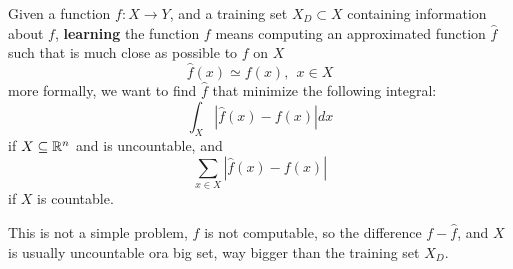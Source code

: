 \documentclass[10pt, letterpaper]{report}
\begin{document}
\begin{definition}
    Given a function $f:X\rightarrow Y$, and a training set $X_D\subset X$ containing information about $f$, \textbf{learning} the function $f$ means computing an approximated function $\hat f$ such that is much close as possible to $f$ on $X$\begin{equation}
        \hat f(x)\simeq f(x), \ \ x\in X
    \end{equation}
    more formally, we want to find $\hat f$ that minimize the following integral:\begin{equation}
        \int_{X}|\hat f(x)-f(x)|dx
    \end{equation}
    if $X\subseteq {\mathbb R}^n$ and is uncountable, and 
    \begin{equation}
        \sum_{x\in X}|\hat f(x)-f(x)|
    \end{equation}
    if $X$ is countable.
\end{definition}
This is not a simple problem, $f$ is not computable, so the difference $f-\hat f$, and $X$ is usually uncountable ora big set, way bigger than the training set $X_D$. \bigskip
\end{document}
